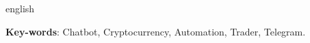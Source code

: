 \begin{resumo}[Abstract]			%
\begin{otherlanguage*}{english}		%



\vspace{\onelineskip}
\noindent
\textbf{Key-words}: Chatbot, Cryptocurrency, Automation, Trader, Telegram.
\end{otherlanguage*}
\end{resumo}

% 

%  
